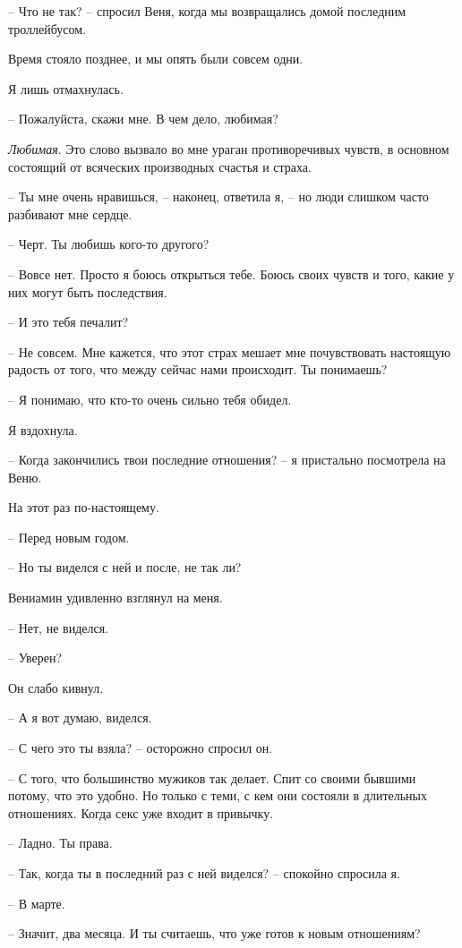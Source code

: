 \documentclass[
]{book}
\begin{document}
-- Что не так? -- спросил Веня, когда мы возвращались домой последним троллейбусом.

Время стояло позднее, и мы опять были совсем одни.

Я лишь отмахнулась.

-- Пожалуйста, скажи мне. В чем дело, любимая?

\emph{Любимая}. Это слово вызвало во мне ураган противоречивых чувств, в основном состоящий от всяческих производных счастья и страха.

-- Ты мне очень нравишься, -- наконец, ответила я, -- но люди слишком часто разбивают мне сердце.

-- Черт. Ты любишь кого-то другого?

-- Вовсе нет. Просто я боюсь открыться тебе. Боюсь своих чувств и того, какие у них могут быть последствия.

-- И это тебя печалит?

-- Не совсем. Мне кажется, что этот страх мешает мне почувствовать настоящую радость от того, что между сейчас нами происходит. Ты понимаешь?

-- Я понимаю, что кто-то очень сильно тебя обидел.

Я вздохнула.

-- Когда закончились твои последние отношения? -- я пристально посмотрела на Веню.

На этот раз по-настоящему.

-- Перед новым годом.

-- Но ты виделся с ней и после, не так ли?

Вениамин удивленно взглянул на меня.

-- Нет, не виделся.

-- Уверен?

Он слабо кивнул.

-- А я вот думаю, виделся.

-- С чего это ты взяла? -- осторожно спросил он.

-- С того, что большинство мужиков так делает. Спит со своими бывшими потому, что это удобно. Но только с теми, с кем они состояли в длительных отношениях. Когда секс уже входит в привычку.

-- Ладно. Ты права.

-- Так, когда ты в последний раз с ней виделся? -- спокойно спросила я.

-- В марте.

-- Значит, два месяца. И ты считаешь, что уже готов к новым отношениям?
\end{document}
